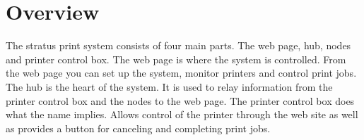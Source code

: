


  

  \pagecolor{white}

  \tableofcontents

  \newpage
  \section{Overview}
  The stratus print system consists of four main parts. The web page, hub, nodes and printer
  control box. The web page is where the system is controlled. From the web page you can set up
  the system, monitor printers and control print jobs. The hub is the heart of the system. It is
  used to relay information from the printer control box and the nodes to the web page. The printer
  control box does what the name implies. Allows control of the printer through the web site as well
  as provides a button for canceling and completing print jobs.
  \newpage
  

  \newpage
  

  \newpage
  

  \newpage
  

  
